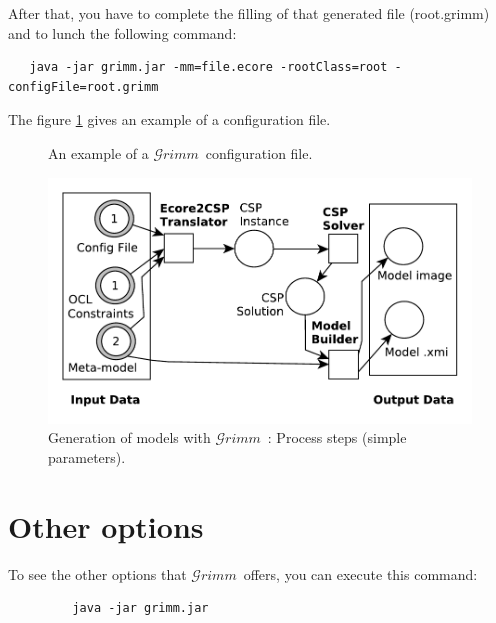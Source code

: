 \documentclass[12pt]{article} %
\newcommand{\grimm}{$\mathcal{G}rimm$\ }
\begin{document}
After that, you have to complete the filling of that generated file (root.grimm) and to lunch the following command:

\begin{verbatim}
   java -jar grimm.jar -mm=file.ecore -rootClass=root -configFile=root.grimm
\end{verbatim}

The figure \ref{configFile} gives an example of a configuration file.

\begin{figure}[!htbp]
\centering

\caption{An example of a \grimm configuration file.}
\label{configFile}
\end{figure}

\begin{figure}[!h]
\centering
\includegraphics[scale=0.8]{precess_rdp2015EN2.pdf}
\caption{Generation of models with \grimm: Process steps (simple parameters).}
\label{process2}
\end{figure} 

\section{Other options}

To see the other options that \grimm offers, you can execute this command:

\begin{verbatim}
         java -jar grimm.jar
\end{verbatim}
 


\end{document}

